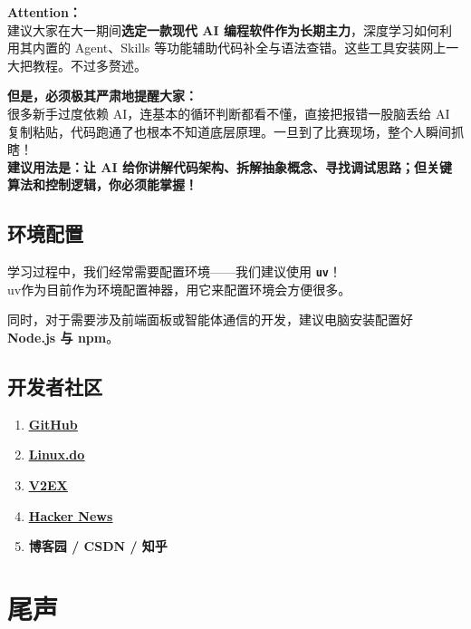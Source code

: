 \documentclass[a4paper,11pt,oneside]{scrreprt}
\begin{document}
\begin{ctbox}
\textbf{Attention：}\\
建议大家在大一期间\textbf{选定一款现代 AI 编程软件作为长期主力}，深度学习如何利用其内置的 Agent、Skills 等功能辅助代码补全与语法查错。这些工具安装网上一大把教程。不过多赘述。

\medskip
\textbf{但是，必须极其严肃地提醒大家：}\\
很多新手过度依赖 AI，连基本的循环判断都看不懂，直接把报错一股脑丢给 AI 复制粘贴，代码跑通了也根本不知道底层原理。一旦到了比赛现场，整个人瞬间抓瞎！\\
\textbf{建议用法是：让 AI 给你讲解代码架构、拆解抽象概念、寻找调试思路；但关键算法和控制逻辑，你必须能掌握！}
\end{ctbox}

\section{环境配置}

学习过程中，我们经常需要配置环境——我们建议使用 \textbf{\texttt{uv}}！\\
uv作为目前作为环境配置神器，用它来配置环境会方便很多。

同时，对于需要涉及前端面板或智能体通信的开发，建议电脑安装配置好 \textbf{Node.js 与 npm}。

\section{开发者社区}

\begin{enumerate}
    \item \textbf{\href{https://github.com/}{\underline{GitHub}}}
    \item \textbf{\href{https://linux.do/}{\underline{Linux.do}}}
    \item \textbf{\href{https://www.v2ex.com/}{\underline{V2EX}}}
    \item \textbf{\href{https://news.ycombinator.com/}{\underline{Hacker News}}}
    \item \textbf{博客园 / CSDN / 知乎}
\end{enumerate}

\chapter*{尾声}
{}
\enlargethispage{2\baselineskip}
\end{document}
